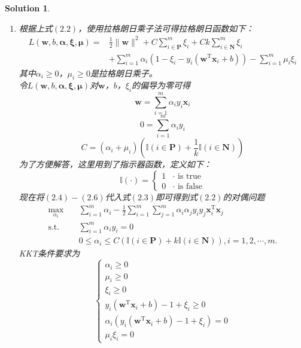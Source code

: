 \documentclass[a4paper,UTF8]{article}
\numberwithin{equation}{section}
\newtheorem*{mySol}{Solution}
\begin{document}
\begin{mySol}
\begin{enumerate}[(1)]
\item 
根据上式$(2.2)$，使用拉格朗日乘子法可得拉格朗日函数如下：
\begin{equation}
\begin{aligned}
L(\mathbf{w},b,\boldsymbol{\alpha},\boldsymbol{\xi},\boldsymbol{\mu}) =& \frac{1}{2} \lVert \mathbf{w} \rVert^2 + C\sum_{i \in \mathbf{P}}^m\xi_i + Ck\sum_{i \in \mathbf{N}}^m\xi_i\\
& + \sum_{i=1}^{m}\alpha_i(1-\xi_i-y_i(\mathbf{w}^\mathrm{T}\mathbf{x}_i + b)) - \sum_{i=1}^{m}\mu_i\xi_i 
\end{aligned}
\end{equation}
其中$\alpha_i \geq 0$，$\mu_i \geq 0$是拉格朗日乘子。\\
令$L(\mathbf{w},b,\boldsymbol{\alpha},\boldsymbol{\xi},\boldsymbol{\mu})$对$\mathbf{w}$，$b$，$\xi_i$的偏导为零可得
\begin{equation}
	\mathbf{w} = \sum_{i=1}^{m}\alpha_iy_i\mathbf{x}_i
\end{equation}
\begin{equation}
	0=\sum_{i=1}^{m}\alpha_iy_i
\end{equation}
\begin{equation}
	C = (\alpha_i + \mu_i)(\mathbb{I}(i\in \mathbf{P}) + \frac{1}{k}\mathbb{I}(i\in \mathbf{N}) )
\end{equation}
为了方便解答，这里用到了指示器函数，定义如下：
\begin{equation}
\mathbb{I}(\cdot) = 
\begin{cases}
1 & \mbox{$\cdot$ is true}\\
0 & \mbox{$\cdot$ is false}
\end{cases}
\end{equation}
现在将$(2.4)-(2.6)$代入式$(2.3)$即可得到式$(2.2)$的对偶问题
\begin{equation}
\begin{split}
\max_{\alpha_i}& \quad \sum_{i=1}^{m}\alpha_i-\frac{1}{2}\sum_{i=1}^{m}\sum_{j=1}^{m}\alpha_i\alpha_jy_iy_j\mathbf{x}_i^\mathrm{T}\mathbf{x}_j\\
\text{s.t.}&  \quad \sum_{i=1}^{m}\alpha_iy_i = 0\\
& \quad 0 \leq \alpha_i \leq C(\mathbb{I}(i\in \mathbf{P}) + k\mathbb{I}(i\in \mathbf{N}) ), i = 1,2,\cdots,m.
\end{split}	
\end{equation}
KKT条件要求为
\begin{equation}
\begin{cases}
\alpha_i \geq 0\\
\mu_i \geq 0\\
\xi_i \geq 0\\
y_i(\mathbf{w}^\mathrm{T}\mathbf{x}_i + b) - 1 + \xi_i \geq 0\\
\alpha_i(y_i(\mathbf{w}^\mathrm{T}\mathbf{x}_i + b) - 1 + \xi_i) = 0\\
\mu_i\xi_i = 0
\end{cases}
\end{equation}
\end{enumerate}
\end{mySol}
\newpage
\end{document}
